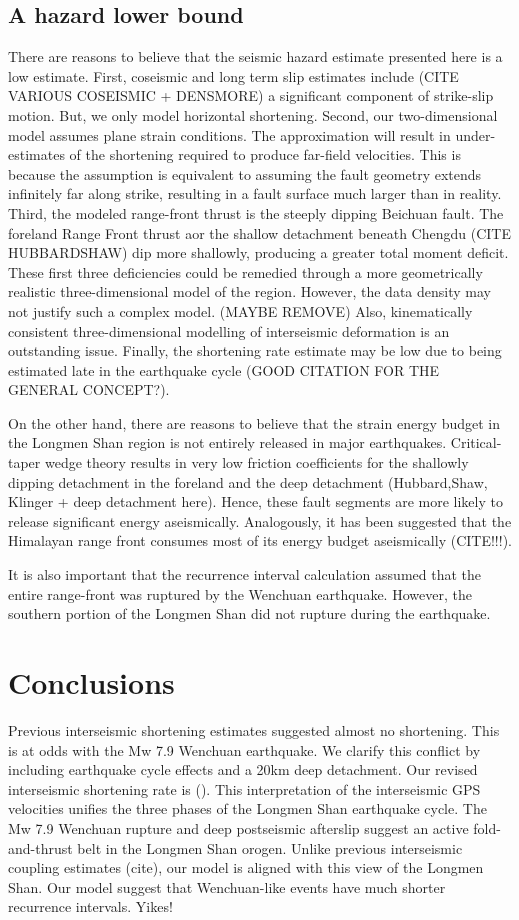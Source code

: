 \documentclass{article}
\begin{document}
\subsection{A hazard lower bound}
There are reasons to believe that the seismic hazard estimate presented here is a low estimate.
First, coseismic and long term slip estimates include (CITE VARIOUS COSEISMIC + DENSMORE) a significant component of strike-slip motion. But, we only model horizontal shortening. 
Second, our two-dimensional model assumes plane strain conditions. 
The approximation will result in under-estimates of the shortening required to produce far-field velocities.
This is because the assumption is equivalent to assuming the fault geometry extends infinitely far along strike, resulting in a fault surface much larger than in reality. 
Third, the modeled range-front thrust is the steeply dipping Beichuan fault. The foreland Range Front thrust aor the shallow detachment beneath Chengdu (CITE HUBBARDSHAW) dip more shallowly, producing a greater total moment deficit.
These first three deficiencies could be remedied through a more geometrically realistic three-dimensional model of the region. However, the data density may not justify such a complex model. 
(MAYBE REMOVE) Also, kinematically consistent three-dimensional modelling of interseismic deformation is an outstanding issue. 
Finally, the shortening rate estimate may be low due to being estimated late in the earthquake cycle (GOOD CITATION FOR THE GENERAL CONCEPT?). 

On the other hand, there are reasons to believe that the strain energy budget in the Longmen Shan region is not entirely released in major earthquakes. Critical-taper wedge theory results in very low friction coefficients for the shallowly dipping detachment in the foreland and the deep detachment (Hubbard,Shaw, Klinger + deep detachment here). Hence, these fault segments are more likely to release significant energy aseismically. Analogously, it has been suggested that the Himalayan range front consumes most of its energy budget aseismically (CITE!!!).

It is also important that the recurrence interval calculation assumed that the entire range-front was ruptured by the Wenchuan earthquake.
However, the southern portion of the Longmen Shan did not rupture during the earthquake. 

\section{Conclusions}
Previous interseismic shortening estimates suggested almost no shortening. This is at odds with the Mw 7.9 Wenchuan earthquake. We clarify this conflict by including earthquake cycle effects and a 20km deep detachment. Our revised interseismic shortening rate is ().
This interpretation of the interseismic GPS velocities unifies the three phases of the Longmen Shan earthquake cycle. The Mw 7.9 Wenchuan rupture and deep postseismic afterslip suggest an active fold-and-thrust belt in the Longmen Shan orogen. Unlike previous interseismic coupling estimates (cite), our model is aligned with this view of the Longmen Shan. 
Our model suggest that Wenchuan-like events have much shorter recurrence intervals. Yikes!
\end{document}
